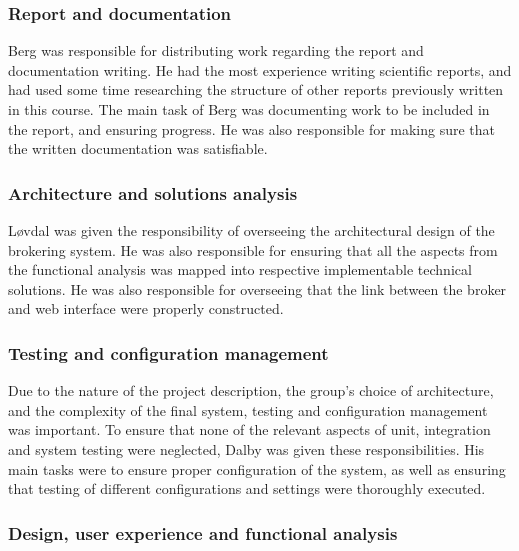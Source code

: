 \subsubsection{Report and documentation}
\label{subsec:process_and_methodology-project_organization-report_and_documentation}

Berg was responsible for distributing work regarding the report and documentation writing. He had the most experience writing scientific reports, and had used some time researching the structure of other reports previously written in this course. The main task of Berg was documenting work to be included in the report, and ensuring progress. He was also responsible for making sure that the written documentation was satisfiable.

\subsubsection{Architecture and solutions analysis}
\label{subsec:process_and_methodology-project_organization-architecture_and_solutions_analysis}

Løvdal was given the responsibility of overseeing the architectural design of the brokering system. He was also responsible for ensuring that all the aspects from the functional analysis was mapped into respective implementable technical solutions. He was also responsible for overseeing that the link between the broker and web interface were properly constructed.

\subsubsection{Testing and configuration management}
\label{subsec:process_and_methodology-project_organization-testing_and_configuration_management}

Due to the nature of the project description, the group's choice of architecture, and the complexity of the final system, testing and configuration management was important. To ensure that none of the relevant aspects of unit, integration and system testing were neglected, Dalby was given these responsibilities. His main tasks were to ensure proper configuration of the system, as well as ensuring that testing of different configurations and settings were thoroughly executed.

\subsubsection{Design, user experience and functional analysis}
\label{subsec:process_and_methodology-project_organization-design_user_experience_and_functional_analysis}

